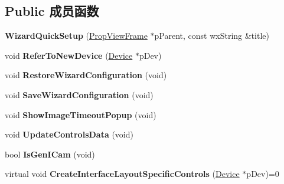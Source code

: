 \subsection*{Public 成员函数}
\begin{DoxyCompactItemize}
\item 
\hypertarget{class_wizard_quick_setup_ac8d810f2e23b6ed40f16d7d6a3c957ba}{{\bfseries Wizard\+Quick\+Setup} (\hyperlink{class_prop_view_frame}{Prop\+View\+Frame} $\ast$p\+Parent, const wx\+String \&title)}\label{class_wizard_quick_setup_ac8d810f2e23b6ed40f16d7d6a3c957ba}

\item 
\hypertarget{class_wizard_quick_setup_af142699e5345211f25ad4f389b46cc8a}{void {\bfseries Refer\+To\+New\+Device} (\hyperlink{classmv_i_m_p_a_c_t_1_1acquire_1_1_device}{Device} $\ast$p\+Dev)}\label{class_wizard_quick_setup_af142699e5345211f25ad4f389b46cc8a}

\item 
\hypertarget{class_wizard_quick_setup_a34a725eec8e4436496d57e7c4dd4bef5}{void {\bfseries Restore\+Wizard\+Configuration} (void)}\label{class_wizard_quick_setup_a34a725eec8e4436496d57e7c4dd4bef5}

\item 
\hypertarget{class_wizard_quick_setup_a9a9fb950cf70513fb65c8ecbe511114f}{void {\bfseries Save\+Wizard\+Configuration} (void)}\label{class_wizard_quick_setup_a9a9fb950cf70513fb65c8ecbe511114f}

\item 
\hypertarget{class_wizard_quick_setup_ae3afbbece628a9fad26a951a43ae4071}{void {\bfseries Show\+Image\+Timeout\+Popup} (void)}\label{class_wizard_quick_setup_ae3afbbece628a9fad26a951a43ae4071}

\item 
\hypertarget{class_wizard_quick_setup_a0acba566a3ef5d90d5569df182b6f383}{void {\bfseries Update\+Controls\+Data} (void)}\label{class_wizard_quick_setup_a0acba566a3ef5d90d5569df182b6f383}

\item 
\hypertarget{class_wizard_quick_setup_a2dd42da76b9e35dc8c890ada71919220}{bool {\bfseries Is\+Gen\+I\+Cam} (void)}\label{class_wizard_quick_setup_a2dd42da76b9e35dc8c890ada71919220}

\item 
\hypertarget{class_wizard_quick_setup_afa985b71861772dcd79d783f15ba823c}{virtual void {\bfseries Create\+Interface\+Layout\+Specific\+Controls} (\hyperlink{classmv_i_m_p_a_c_t_1_1acquire_1_1_device}{Device} $\ast$p\+Dev)=0}\label{class_wizard_quick_setup_afa985b71861772dcd79d783f15ba823c}


\end{DoxyCompactItemize}
